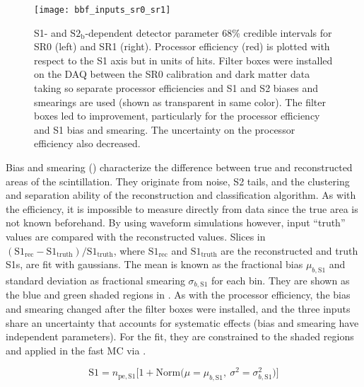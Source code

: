 \begin{figure}
\centering
\texttt{[image: bbf\_inputs\_sr0\_sr1]}
\caption[S1- and $\mathrm{S2_b}$-dependent detector parameter 68\% credible intervals for SR0 (left) and SR1 (right).]{S1- and
$\mathrm{S2_b}$-dependent detector parameter 68\% credible intervals for SR0 (left) and SR1 (right).  Processor
efficiency (red) is plotted with respect to the
S1 axis but in units of hits.  Filter boxes were installed on the DAQ between the SR0 \ambe calibration and
dark matter data taking so separate processor efficiencies and S1 and S2 biases and smearings are used (shown as transparent in same
color).  The filter boxes led to improvement, particularly for the processor efficiency and S1 bias and smearing.  The uncertainty on the
processor efficiency also decreased.}
\label{fig:er_nr_calibrations_parameter_determ_det_phys_inputs}
\end{figure}

Bias and smearing () characterize the difference between true and reconstructed areas of the
scintillation.  They originate from noise, S2 tails, and the clustering and separation ability of the reconstruction and classification
algorithm.  As with the efficiency, it is
impossible to measure directly from data since the true area is not known beforehand.  By using
waveform simulations however, input ``truth'' values are compared with the reconstructed values.  Slices in
$(\mathrm{S1_{rec}} - \mathrm{S1_{truth}}) / \mathrm{S1_{truth}}$, where
$\mathrm{S1_{rec}}$ and $\mathrm{S1_{truth}}$ are the reconstructed and truth S1s, are fit with gaussians.  The mean is known as
the fractional bias $\mu_{b, \mathrm{S1}}$ and standard deviation as fractional smearing $\sigma_{b, \mathrm{S1}}$ for each bin.  They
are shown as the blue and green shaded regions in
.  As with the processor efficiency, the bias and smearing changed after
the filter boxes were installed, and the three inputs share an uncertainty that accounts for systematic effects (bias and smearing have
independent parameters).  For the fit, they are constrained to the shaded regions and applied
in the fast MC via .

\vspace{-10pt}

\begin{equation}
\mathrm{S1} = n_{\mathrm{pe,S1}} \Big[ 1 + \mathrm{Norm} \big( \mu = \mu_{b, \mathrm{S1}},\ \sigma^2 = \sigma_{b, \mathrm{S1}}^2 \big)
\Big]
\label{eq:er_nr_calibrations_parameter_determ_det_phys_s1_bias_smear}
\end{equation}

